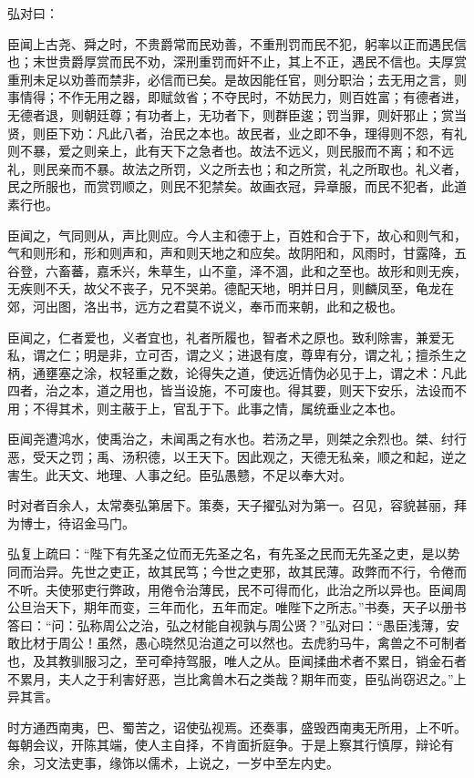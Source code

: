 \documentclass[]{article}
\begin{document}
弘对曰：

臣闻上古尧、舜之时，不贵爵常而民劝善，不重刑罚而民不犯，躬率以正而遇民信也；末世贵爵厚赏而民不劝，深刑重罚而奸不止，其上不正，遇民不信也。夫厚赏重刑未足以劝善而禁非，必信而已矣。是故因能任官，则分职治；去无用之言，则事情得；不作无用之器，即赋敛省；不夺民时，不妨民力，则百姓富；有德者进，无德者退，则朝廷尊；有功者上，无功者下，则群臣逡；罚当罪，则奸邪止；赏当贤，则臣下劝：凡此八者，治民之本也。故民者，业之即不争，理得则不怨，有礼则不暴，爱之则亲上，此有天下之急者也。故法不远义，则民服而不离；和不远礼，则民亲而不暴。故法之所罚，义之所去也；和之所赏，礼之所取也。礼义者，民之所服也，而赏罚顺之，则民不犯禁矣。故画衣冠，异章服，而民不犯者，此道素行也。

臣闻之，气同则从，声比则应。今人主和德于上，百姓和合于下，故心和则气和，气和则形和，形和则声和，声和则天地之和应矣。故阴阳和，风雨时，甘露降，五谷登，六畜蕃，嘉禾兴，朱草生，山不童，泽不涸，此和之至也。故形和则无疾，无疾则不夭，故父不丧子，兄不哭弟。德配天地，明并日月，则麟凤至，龟龙在郊，河出图，洛出书，远方之君莫不说义，奉币而来朝，此和之极也。

臣闻之，仁者爱也，义者宜也，礼者所履也，智者术之原也。致利除害，兼爱无私，谓之仁；明是非，立可否，谓之义；进退有度，尊卑有分，谓之礼；擅杀生之柄，通壅塞之涂，权轻重之数，论得失之道，使远近情伪必见于上，谓之术：凡此四者，治之本，道之用也，皆当设施，不可废也。得其要，则天下安乐，法设而不用；不得其术，则主蔽于上，官乱于下。此事之情，属统垂业之本也。

臣闻尧遭鸿水，使禹治之，未闻禹之有水也。若汤之旱，则桀之余烈也。桀、纣行恶，受天之罚；禹、汤积德，以王天下。因此观之，天德无私亲，顺之和起，逆之害生。此天文、地理、人事之纪。臣弘愚戆，不足以奉大对。

时对者百余人，太常奏弘第居下。策奏，天子擢弘对为第一。召见，容貌甚丽，拜为博士，待诏金马门。

弘复上疏曰：``陛下有先圣之位而无先圣之名，有先圣之民而无先圣之吏，是以势同而治异。先世之吏正，故其民笃；今世之吏邪，故其民薄。政弊而不行，令倦而不听。夫使邪吏行弊政，用倦令治薄民，民不可得而化，此治之所以异也。臣闻周公旦治天下，期年而变，三年而化，五年而定。唯陛下之所志。''书奏，天子以册书答曰：``问：弘称周公之治，弘之材能自视孰与周公贤？''弘对曰：``愚臣浅薄，安敢比材于周公！虽然，愚心晓然见治道之可以然也。去虎豹马牛，禽兽之不可制者也，及其教驯服习之，至可牵持驾服，唯人之从。臣闻揉曲术者不累日，销金石者不累月，夫人之于利害好恶，岂比禽兽木石之类哉？期年而变，臣弘尚窃迟之。''上异其言。

时方通西南夷，巴、蜀苦之，诏使弘视焉。还奏事，盛毁西南夷无所用，上不听。每朝会议，开陈其端，使人主自择，不肯面折庭争。于是上察其行慎厚，辩论有余，习文法吏事，缘饰以儒术，上说之，一岁中至左内史。
\end{document}

